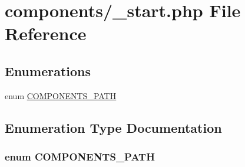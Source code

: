 \hypertarget{components_2__start_8php}{
\section{components/\_\-start.php File Reference}
\label{components_2__start_8php}
}
\subsection*{Enumerations}
\begin{CompactItemize}
\item 
enum \hyperlink{components_2__start_8php_a354c4c2689d1d4fa7fd1f4e940a6b2a}{COMPONENTS\_\-PATH} 
\end{CompactItemize}


\subsection{Enumeration Type Documentation}
\hypertarget{components_2__start_8php_a354c4c2689d1d4fa7fd1f4e940a6b2a}{
\subsubsection[{COMPONENTS\_\-PATH}]{\setlength{\rightskip}{0pt plus 5cm}enum {\bf COMPONENTS\_\-PATH}}}
\label{components_2__start_8php_a354c4c2689d1d4fa7fd1f4e940a6b2a}


